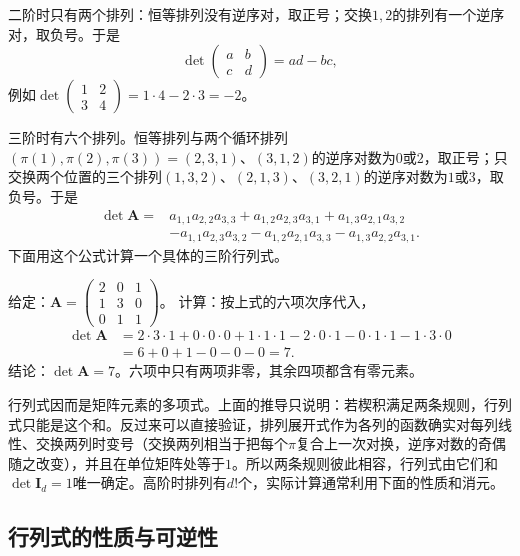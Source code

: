 二阶时只有两个排列：恒等排列没有逆序对，取正号；交换$1,2$的排列有一个逆序对，取负号。于是
\[
 \det\begin{pmatrix}a&b\\c&d\end{pmatrix}=ad-bc,
\]
例如$\det\left(\begin{smallmatrix}1&2\\3&4\end{smallmatrix}\right)=1\cdot4-2\cdot3=-2$。

三阶时有六个排列。恒等排列与两个循环排列$(\pi(1),\pi(2),\pi(3))=(2,3,1)$、$(3,1,2)$的逆序对数为$0$或$2$，取正号；只交换两个位置的三个排列$(1,3,2)$、$(2,1,3)$、$(3,2,1)$的逆序对数为$1$或$3$，取负号。于是
\[
 \begin{aligned}
 \det\bm A={}&a_{1,1}a_{2,2}a_{3,3}+a_{1,2}a_{2,3}a_{3,1}+a_{1,3}a_{2,1}a_{3,2}\\
 &-a_{1,1}a_{2,3}a_{3,2}-a_{1,2}a_{2,1}a_{3,3}-a_{1,3}a_{2,2}a_{3,1}.
 \end{aligned}
\]
下面用这个公式计算一个具体的三阶行列式。
\begin{example}[三阶行列式的排列展开]
\label{ex:ls-det-three-by-three}
给定：$\bm A=\left(\begin{smallmatrix}2&0&1\\1&3&0\\0&1&1\end{smallmatrix}\right)$。
计算：按上式的六项次序代入，
\[
 \begin{aligned}
 \det\bm A&=2\cdot3\cdot1+0\cdot0\cdot0+1\cdot1\cdot1-2\cdot0\cdot1-0\cdot1\cdot1-1\cdot3\cdot0\\
 &=6+0+1-0-0-0=7.
 \end{aligned}
\]
结论：$\det\bm A=7$。六项中只有两项非零，其余四项都含有零元素。
\end{example}

行列式因而是矩阵元素的多项式。上面的推导只说明：若楔积满足两条规则，行列式只能是这个和。反过来可以直接验证，排列展开式作为各列的函数确实对每列线性、交换两列时变号（交换两列相当于把每个$\pi$复合上一次对换，逆序对数的奇偶随之改变），并且在单位矩阵处等于$1$。所以两条规则彼此相容，行列式由它们和$\det\bm I_d=1$唯一确定。高阶时排列有$d!$个，实际计算通常利用下面的性质和消元。



\subsection{行列式的性质与可逆性}
\label{sec:ls-determinant-properties}
\label{sec:prelim-determinants}

